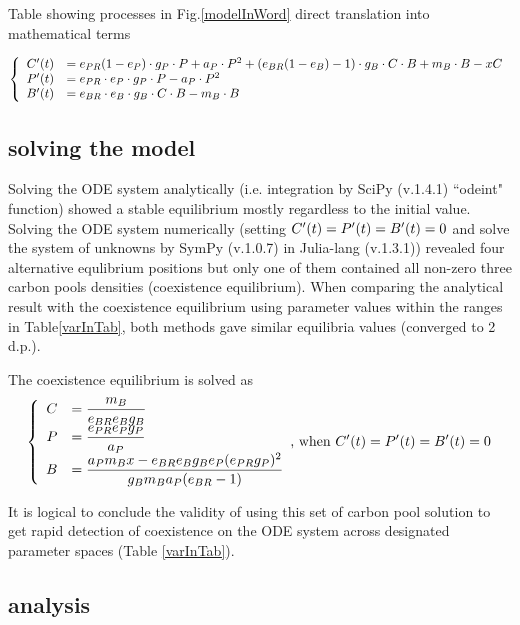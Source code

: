 \documentclass[../thesis.tex]{subfiles} %
\begin{document}
\begin{table}[H]
    \centering
    \caption[Processes in algebra terms]{Table showing processes in Fig.\ref{modelInWord} direct translation into mathematical terms}
    \label{termInTab}
\end{table}

\begin{equation}\left\{\begin{array}{rl}
    C'(t) &= e_{PR}(1-e_P)\cdot g_P\cdot P +a_P\cdot P^2 +(e_{BR}(1-e_B)-1)\cdot g_B\cdot C\cdot B +m_B\cdot B -xC\\
    P'(t) &= e_{PR}\cdot e_P\cdot g_P\cdot P -a_P\cdot P^2\\
    B'(t) &= e_{BR}\cdot e_B\cdot g_B\cdot C\cdot B -m_B\cdot B
\end{array}\right.\label{eq:ode}\end{equation}

\subsection{solving the model}
Solving the ODE system analytically (i.e. integration by SciPy (v.1.4.1) ``odeint" function) showed a stable equilibrium mostly regardless to the initial value.  Solving the ODE system numerically (setting $C'(t)=P'(t)=B'(t)=0$ and solve the system of unknowns by SymPy (v.1.0.7) in Julia-lang (v.1.3.1)) revealed four alternative equlibrium positions but only one of them contained all non-zero three carbon pools densities (coexistence equilibrium).  When comparing the analytical result with the coexistence equilibrium using parameter values within the ranges in Table\ref{varInTab}, both methods gave similar equilibria values (converged to 2 d.p.).

The coexistence equilibrium is solved as
\begin{equation}\left\{\begin{array}{rl}
    C &= \dfrac{m_B}{e_{BR}e_Bg_B}\\
    P &= \dfrac{e_{PR}e_Pg_P}{a_P}\\
    B &= \dfrac{a_Pm_B x-e_{BR}e_Bg_Be_P(e_{PR}g_P)^2}{g_Bm_Ba_P(e_{BR}-1)}
\end{array}\label{eq:solC}\text{, when }C'(t)=P'(t)=B'(t)=0
\right.\end{equation}

It is logical to conclude the validity of using this set of carbon pool solution to get rapid detection of coexistence on the ODE system across designated parameter spaces (Table \ref{varInTab}).

\subsection{analysis}
\end{document}
